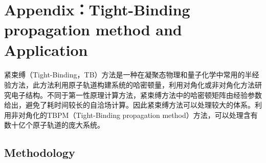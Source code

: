 \section{Appendix：Tight-Binding propagation method and Application}
\paragraph{} 紧束缚（Tight-Binding，TB）方法是一种在凝聚态物理和量子化学中常用的半经验方法，此方法利用原子轨道构建系统的哈密顿量，利用对角化或非对角化方法研究电子结构。\cite{Li}不同于第一性原理计算方法，紧束缚方法中的哈密顿矩阵由经验参数给出，避免了耗时间较长的自洽场计算\cite{sb}。因此紧束缚方法可以处理较大的体系。利用非对角化的TBPM（Tight-Binding propagation method）方法，可以处理含有数十亿个原子轨道的庞大系统。
\subsection{Methodology}
